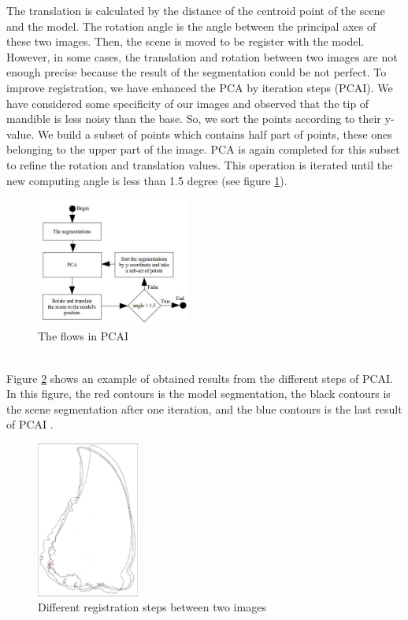 \documentclass[twoside,twocolumn,10pt]{article}
\begin{document}
The translation is calculated by the distance of the centroid point of the scene and the model. The rotation angle is the angle between the principal axes of these two images. Then, the scene is moved to be register with the model. However,
in some cases, the translation and rotation between two images are
not enough precise because the result of the segmentation could be not perfect. To improve registration, we have enhanced the PCA by iteration steps (PCAI). We have considered some specificity of our images and observed that the tip of mandible is less noisy than the base. So, we sort the points according to their y-value. We build a subset of points which contains half part of points, these ones belonging to the upper part of the image. PCA is again completed for this subset to refine the rotation and translation values. This operation is iterated until the new computing angle is less than 1.5 degree (see figure \ref{fig:pcai}).
\begin{figure}[htb]
    \centering
    \includegraphics[width=0.45\textwidth]{./images/pcadiagram}
    \caption{The flows in PCAI}
    \label{fig:pcai}
\end{figure}~\\
Figure \ref{fig:box} shows an example of obtained results from the different steps of PCAI. In this figure, the red contours is the model segmentation, the black contours is the scene segmentation after one iteration, and the blue contours is the last result of PCAI .\\

\begin{figure}[htb]
    \centering
    \includegraphics[width=0.3\textwidth]{./images/imreg}
    \caption{Different registration steps between two images}
    \label{fig:box}
\end{figure}
\end{document}
